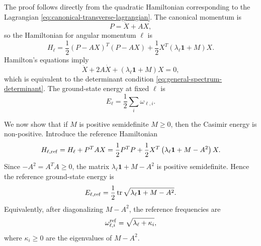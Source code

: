 \documentclass[a4paper,11pt]{article}
\begin{document}
The proof follows directly from the quadratic Hamiltonian corresponding to the Lagrangian \eqref{eq:canonical-transverse-lagrangian}. The canonical momentum is
\begin{equation}
  P=\dot X+AX,
\end{equation}
so the Hamiltonian for angular momentum $\ell$ is
\begin{equation}\label{eq:general-transverse-hamiltonian}
  H_\ell = \frac12(P-AX)^T(P-AX) + \frac12 X^T\left(\lambda_\ell\mathbf 1+M\right)X .
\end{equation}
Hamilton's equations imply
\begin{equation}
  \ddot X+2A\dot X+\left(\lambda_\ell\mathbf 1+M\right)X=0,
\end{equation}
which is equivalent to the determinant condition \eqref{eq:general-spectrum-determinant}. The ground-state energy at fixed
$\ell$ is
\begin{equation}\label{eq:ell-zero-point-energy}
  E_\ell = \frac12\sum_i\omega_{\ell,i}.
\end{equation}

We now show that if $M$ is positive semidefinite $M\geq 0$, then the Casimir energy is non-positive. Introduce the reference Hamiltonian
\begin{equation}\label{eq:reference-oscillator}
  H_{\ell,\rm ref} =H_\ell+P^TAX= \frac12P^TP + \frac12 X^T\left(\lambda_\ell\mathbf 1+M-A^2\right)X .
\end{equation}
Since $-A^2=A^TA\geq0$, the matrix
$\lambda_\ell\mathbf 1+M-A^2$ is positive semidefinite. Hence the reference
ground-state energy is
\begin{equation}\label{eq:reference-energy}
  E_{\ell,\rm ref} = \frac12\operatorname{tr}\sqrt{\lambda_\ell\mathbf 1+M-A^2}.
\end{equation}
Equivalently, after diagonalizing $M-A^2$, the reference frequencies are
\begin{equation}
  \omega^{\rm ref}_{\ell,i}=\sqrt{\lambda_\ell+\kappa_i},
\end{equation}
where $\kappa_i\geq0$ are the eigenvalues of $M-A^2$.
\end{document}
